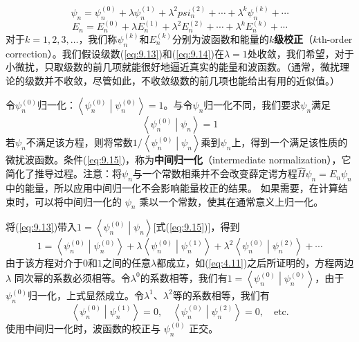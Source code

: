     \begin{equation}
        \psi_n = \psi_n^{\left(0\right)} + \lambda \psi_n^{\left(1\right)} + \lambda^2 psi_n^{\left(2\right)} + \cdots + \lambda^k \psi_n^{\left(k\right)} + \cdots
        \label{eq:9.13}
    \end{equation}
    \begin{equation}
        E_n = E_n^{\left(0\right)} + \lambda E_n^{\left(1\right)} + \lambda^2 E_n^{\left(2\right)} + \cdots + \lambda^k E_n^{\left(k\right)} + \cdots
        \label{eq:9.14}
    \end{equation}
    对于$k = 1,2,3,\ldots$，我们称$\psi_n^{\left(k\right)}$和$E_n^{\left(k\right)}$分别为波函数和能量的\textbf{$k$级校正}（$k$th-order correction）。我们假设级数(\ref{eq:9.13})和(\ref{eq:9.14})在$\lambda=1$处收敛，我们希望，对于小微扰，只取级数的前几项就能很好地逼近真实的能量和波函数。（通常，微扰理论的级数并不收敛，尽管如此，不收敛级数的前几项也能给出有用的近似值。）

    令$\psi_n^{\left(0\right)}$归一化：$\left\langle \psi_n^{\left(0\right)} \middle| \psi_n^{\left(0\right)} \right\rangle = 1$。与令$\psi_n$归一化不同，我们要求$\psi_n$满足
    \begin{equation}
        \left\langle \psi_n^{\left(0\right)} \middle| \psi_n \right\rangle = 1
        \label{eq:9.15}
    \end{equation}
    若$\psi_n$不满足该方程，则将常数$1/\left\langle \psi_n^{\left(0\right)} \middle| \psi_n \right\rangle$乘到$\psi_n$上，得到一个满足该性质的微扰波函数。条件(\ref{eq:9.15})，称为\textbf{中间归一化}（intermediate normalization），它简化了推导过程。注意：将$\psi_n$与一个常数相乘并不会改变薛定谔方程$\hat{H} \psi_n = E_n \psi_n$中的能量，所以应用中间归一化不会影响能量校正的结果。 如果需要，在计算结束时，可以将中间归一化的 $\psi_n$ 乘以一个常数，使其在通常意义上归一化。

    将(\ref{eq:9.13})带入$1 = \left\langle \psi_n^{\left(0\right)} \middle| \psi_n \right\rangle$[式(\ref{eq:9.15})]，得到
    \begin{equation*}
        1 = \left\langle \psi_n^{\left(0\right)} \middle| \psi_n^{\left(0\right)} \right\rangle + \lambda \left\langle \psi_n^{\left(0\right)} \middle| \psi_n^{\left(1\right)} \right\rangle + \lambda^2 \left\langle \psi_n^{\left(0\right)} \middle| \psi_n^{\left(2\right)} \right\rangle + \cdots
    \end{equation*}
    由于该方程对介于$0$和$1$之间的任意$\lambda$都成立，如(\ref{eq:4.11})之后所证明的，方程两边 $\lambda$ 同次幂的系数必须相等。令$\lambda^0$的系数相等，我们有$1 = \left\langle \psi_n^{\left(0\right)} \middle| \psi_n^{\left(0\right)} \right\rangle$，由于$\psi_n^{\left(0\right)}$归一化，上式显然成立。令$\lambda^1$、$\lambda^2$等的系数相等，我们有
    \begin{equation}
        \left\langle \psi_n^{\left(0\right)} \middle| \psi_n^{\left(1\right)} \right\rangle = 0, \quad \left\langle \psi_n^{\left(0\right)} \middle| \psi_n^{\left(2\right)} \right\rangle = 0, \quad \text{etc.}
        \label{eq:9.16}
    \end{equation}
    使用中间归一化时，波函数的校正与 $\psi_n^{\left(0\right)}$ 正交。

